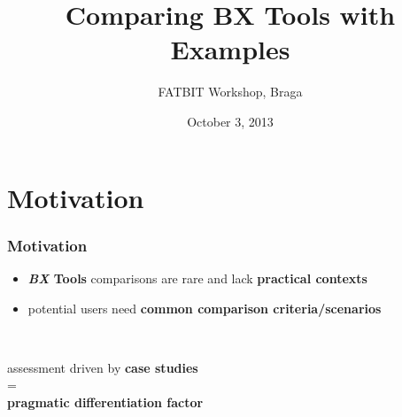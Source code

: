 \documentclass{beamer}
\title[Comparing BX Tools with Examples]{Comparing BX Tools with Examples\\ } %
\author{	
FATBIT Workshop, Braga
} %
\institute[DI.UM] %
{
HASLab, University of Minho \\ %
}
\date{October 3, 2013} %
\begin{document}
\begin{frame}
\titlepage %
\end{frame}









\section{Motivation}

\begin{frame}
\frametitle{Motivation}

\begin{itemize}

\item \textbf{\textit{BX} Tools} comparisons are rare and lack \textbf{practical contexts}

\item potential users need \textbf{common comparison criteria/scenarios}

\end{itemize}

~\\

\begin{center}
assessment driven by \textbf{case studies}\\
 =\\
\textbf{pragmatic differentiation factor}
\end{center}


\end{frame}
\end{document}
